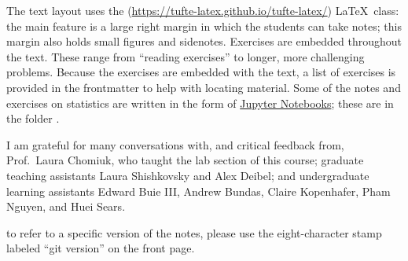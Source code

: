 The text layout uses the  (\url{https://tufte-latex.github.io/tufte-latex/}) \LaTeX\ class:  the main feature is a large right margin in which the students can take notes; this margin also holds small figures and sidenotes. Exercises are embedded throughout the text.  These range from ``reading exercises'' to longer, more challenging problems.  Because the exercises are embedded with the text, a list of exercises is provided in the frontmatter to help with locating material. Some of the notes and exercises on statistics are written in the form of \href{http://jupyter.org}{Jupyter Notebooks}; these are in the folder .

I am grateful for many conversations with, and critical feedback from, Prof.~Laura Chomiuk, who taught the lab section of this course; graduate teaching assistants Laura Shishkovsky and Alex Deibel; and undergraduate learning assistants Edward Buie III, Andrew Bundas, Claire Kopenhafer, Pham Nguyen, and Huei Sears. 

 to refer to a specific version of the notes, please use the eight-character stamp labeled ``git version'' on the front page.
